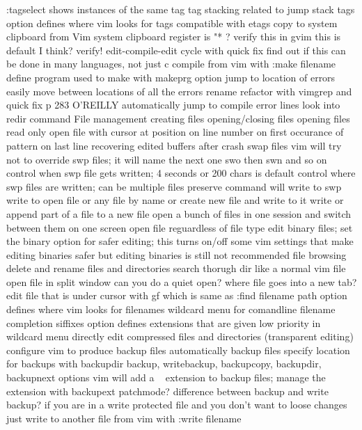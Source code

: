 \documentclass[12pt]{book}
\begin{document}
{    :tagselect shows instances of the same tag
    tag stacking
      related to jump stack
    tags option defines where vim looks for tags
    compatible with etags
  copy to system clipboard from Vim
    system clipboard register is "* ?  verify this
    in gvim this is default I think? verify!
  edit-compile-edit cycle with quick fix
    find out if this can be done in many languages, not just c
    compile from vim with :make filename
    define program used to make with makeprg option
    jump to location of errors
    easily move between locations of all the errors
  rename refactor with vimgrep and quick fix
    p 283 O'REILLY
  automatically jump to compile error lines
    look into redir command
  File management
    creating files
    opening/closing files
    opening files read only
    open file with cursor at position
      on line number
      on first occurance of pattern
      on last line
    recovering edited buffers after crash
      swap files
      vim will try not to override swp files; it will name the next one swo then swn and so on
      control when swp file gets written; 4 seconds or 200 chars is default
      control where swp files are written; can be multiple files
      preserve command will write to swp
    write to open file or any file by name or create new file and write to it
    write or append part of a file to a new file
    open a bunch of files in one session and switch between them on one screen
    open file reguardless of file type
      edit binary files; set the binary option for safer editing; this turns on/off some vim settings that make editing binaries safer but editing binaries is still not recommended
    file browsing
      delete and rename files and directories
      search thorugh dir like a normal vim file
      open file in split window
      can you do a quiet open? where file goes into a new tab?
      edit file that is under cursor with gf which is same as :find filename
        path option defines where vim looks for filenames
      wildcard menu for comandline filename completion
        siffixes option defines extensions that are given low priority in wildcard menu
    directly edit compressed files and directories (transparent editing)
    configure vim to produce backup files
      automatically backup files
      specify location for backups with backupdir
      backup, writebackup, backupcopy, backupdir, backupnext options
      vim will add a ~ extension to backup files; manage the extension with backupext
      patchmode?
      difference between backup and write backup?
      if you are in a write protected file and you don't want to loose changes just write to another file from vim with :write filename
}
\end{document}
